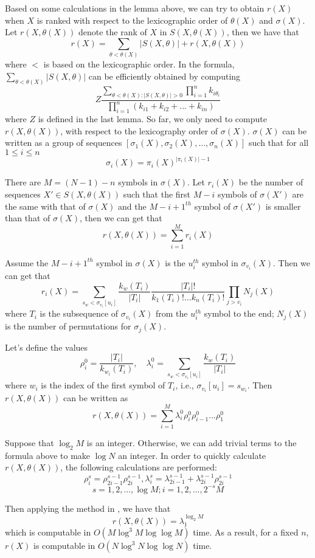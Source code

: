 \documentclass[journal]{IEEEtran}
\begin{document}
\proof
Based on some calculations in the lemma above, we can try to obtain $r(X)$ when $X$ is ranked
with respect to the lexicographic order of $\theta(X)$ and $\sigma(X)$.
Let $r(X,\theta(X))$ denote the rank of $X$ in $S(X,\theta(X))$, then we have that
$$r(X)=\sum_{\theta<\theta(X)}|S(X,\theta)|+r(X,\theta(X))$$
where $<$ is based on the lexicographic order. In the formula, $\sum_{\theta<\theta(X)}|S(X,\theta)|$ can be efficiently obtained by computing
$$Z\frac{\sum_{\theta<\theta(X):|S(X,\theta)|>0}\prod_{i=1}^n k_{i\theta_i}}{\prod_{i=1}^n(k_{i1}+k_{i2}+...+k_{in})}$$
where $Z$ is defined in the last lemma.
So far, we only need to compute $r(X,\theta(X))$, with respect to the lexicography order of $\sigma(X)$. $\sigma(X)$ can be written as a group of sequences $[\sigma_1(X),\sigma_2(X),...,\sigma_n(X)]$ such that for all $1\leq i\leq n$
$$\sigma_i(X)=\pi_i(X)^{|\pi_i(X)|-1}$$

There are $M=(N-1)-n$ symbols in $\sigma(X)$. Let $r_i(X)$ be the number of sequences $X'\in S(X, \theta(X))$ such that the first $M-i$
symbols of $\sigma(X')$ are the same with that of $\sigma(X)$ and the $M-i+1^{th}$ symbol of $\sigma(X')$ is smaller than that of $\sigma(X)$, then we can get that
$$r(X,\theta(X))=\sum_{i=1}^{M} r_i(X)$$

Assume the $M-i+1^{th}$ symbol in $\sigma(X)$ is the $u_i^{th}$ symbol in $\sigma_{v_i}(X)$. Then we can get that
$$r_i(X)=\sum_{s_w<{\sigma_{v_i}}[u_i]}\frac{k_w(T_i)}{|T_i|}\frac{|T_i|!}{k_1(T_i)!...k_n(T_i)!} \prod_{j>v_i} N_j(X)$$
where $T_i$ is the subsequence of $\sigma_{v_i}(X)$ from the $u_i^{th}$ symbol to the end; $N_j(X)$
is the number of permutations for $\sigma_j(X)$.

Let's define the values
$$\rho_i^0=\frac{|T_i|}{k_{w_i}(T_i)},\quad \lambda_i^0=\sum_{s_w<\sigma_{v_i}[u_i]} \frac{k_w(T_i)}{|T_i|}$$
where $w_i$ is the index of the first symbol of $T_i$, i.e., ${\sigma_{v_i}}[u_i]=s_{w_i}$. Then $r(X,\theta(X))$ can be written as
$$r(X,\theta(X))=\sum_{i=1}^{M} \lambda_i^0\rho_i^0\rho_{i-1}^0...\rho_1^0$$

Suppose that $\log_2 M $ is an integer. Otherwise, we can add trivial terms to the formula above to make $\log N$ an integer. In order to quickly calculate $r(X,\theta(X))$, the following calculations are performed:
$$\rho_i^s = \rho_{2i-1}^{s-1}\rho_{2i}^{s-1},\lambda_i^s=\lambda_{2i-1}^{s-1}+\lambda_{2i}^{s-1}\rho_{2i}^{s-1}$$
$$s=1,2,...,\log M; i=1,2,..., 2^{-s}M$$

Then applying the method in \cite{Ryabko2000}, we have that
$$r(X,\theta(X))=\lambda_1^{\log_2 M}$$
which is computable in $O(M\log^3M \log\log M)$ time. As a result, for a fixed $n$, $r(X)$ is computable in $O(N\log^3 N \log\log N)$ time.
\hfill\QED
\end{document}

